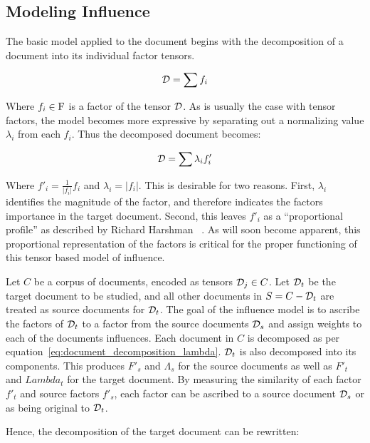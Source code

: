 \documentclass[../dissertation.tex]{subfiles}
\begin{document}
\subsection{Modeling Influence}
The basic model applied to the document begins with the decomposition
of a document into its individual factor tensors.

\begin{equation} \label{eq:document_decomposition}
  \mathcal{D} = \sum f_i 
\end{equation}

Where $f_i\in \mathrm{F}$ is a factor of the tensor $\mathcal{D}$.  As is
usually the case with tensor factors, the model becomes more
expressive by separating out a normalizing value $\lambda_i$ from each
$f_i$.  Thus the decomposed document becomes:

\begin{equation} \label{eq:document_decomposition_normal}
  \mathcal{D} = \sum \lambda_i f'_i
\end{equation}

Where $f'_i=\frac{1}{|f_i|} f_i$ and $\lambda_i = |f_i|$.  This is
desirable for two reasons.  First, $\lambda_i$ identifies the magnitude
of the factor, and therefore indicates the factors importance in the
target document.  Second, this leaves $f'_i$ as a ``proportional
profile'' as described by Richard Harshman~\cite{harshman1970} . As
will soon become apparent, this proportional representation of the
factors is critical for the proper functioning of this tensor based
model of influence.

Let $C$ be a corpus of documents, encoded as tensors $\mathcal{D}_j
\in C$.  Let $\mathcal{D}_t$ be the target document to be studied, and
all other documents in $S=C - \mathcal{D}_t$ are treated as source
documents for $\mathcal{D}_t$.  The goal of the influence model is to
ascribe the factors of $\mathcal{D}_t$ to a factor from the source
documents $\mathcal{D}_s$ and assign weights to each of the documents
influences. Each document in $C$ is decomposed as per
equation~\ref{eq:document_decomposition_lambda}.  $\mathcal{D}_t$ is
also decomposed into its components.  This produces $F'_s$ and
$\Lambda_s$ for the source documents as well as $F'_t$ and $Lambda_t$
for the target document.  By measuring the similarity of each factor
$f'_t$ and source factors $f'_s$, each factor can be ascribed to a
source document $\mathcal{D}_s$ or as being original to
$\mathcal{D}_t$.

Hence, the decomposition of the target document can be rewritten:
\end{document}
